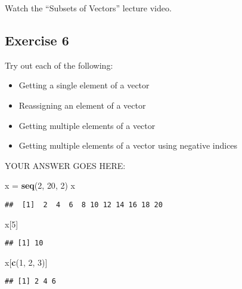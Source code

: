 \documentclass[
]{article}
\newenvironment{Shaded}{\begin{snugshade}}{\end{snugshade}}
\newcommand{\DecValTok}[1]{\textcolor[rgb]{0.00,0.00,0.81}{#1}}
\newcommand{\KeywordTok}[1]{\textcolor[rgb]{0.13,0.29,0.53}{\textbf{#1}}}
\newcommand{\NormalTok}[1]{#1}
\newcommand{\StringTok}[1]{\textcolor[rgb]{0.31,0.60,0.02}{#1}}
\providecommand{\tightlist}{%
  \setlength{\itemsep}{0pt}\setlength{\parskip}{0pt}}
\begin{document}
Watch the ``Subsets of Vectors'' lecture video.

\hypertarget{exercise-6}{%
\subsection{Exercise 6}\label{exercise-6}}

Try out each of the following:

\begin{itemize}
\tightlist
\item
  Getting a single element of a vector
\item
  Reassigning an element of a vector
\item
  Getting multiple elements of a vector
\item
  Getting multiple elements of a vector using negative indices
\end{itemize}

YOUR ANSWER GOES HERE:

\begin{Shaded}
\begin{Highlighting}[]
\NormalTok{x =}\StringTok{ }\KeywordTok{seq}\NormalTok{(}\DecValTok{2}\NormalTok{, }\DecValTok{20}\NormalTok{, }\DecValTok{2}\NormalTok{)}
\NormalTok{x}
\end{Highlighting}
\end{Shaded}

\begin{verbatim}
##  [1]  2  4  6  8 10 12 14 16 18 20
\end{verbatim}

\begin{Shaded}
\begin{Highlighting}[]
\NormalTok{x[}\DecValTok{5}\NormalTok{]}
\end{Highlighting}
\end{Shaded}

\begin{verbatim}
## [1] 10
\end{verbatim}

\begin{Shaded}
\begin{Highlighting}[]
\NormalTok{x[}\KeywordTok{c}\NormalTok{(}\DecValTok{1}\NormalTok{, }\DecValTok{2}\NormalTok{, }\DecValTok{3}\NormalTok{)]}
\end{Highlighting}
\end{Shaded}

\begin{verbatim}
## [1] 2 4 6
\end{verbatim}
\end{document}
